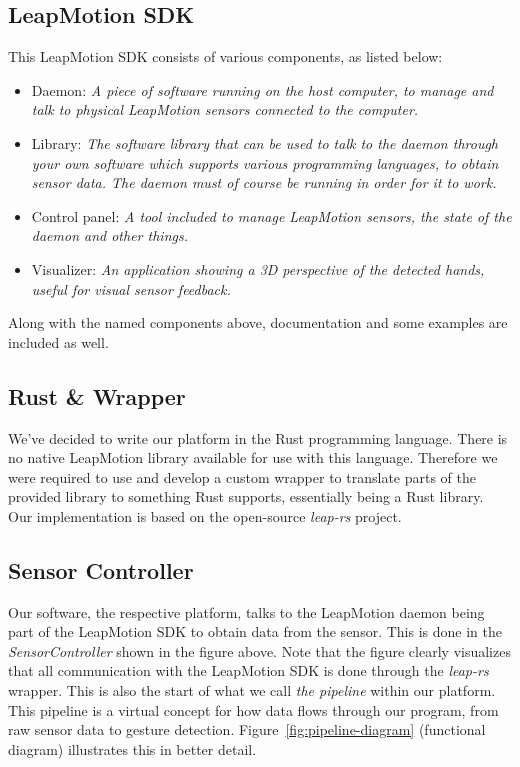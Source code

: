 \documentclass{standalone}
\begin{document}
  \subsection{LeapMotion SDK}
  This LeapMotion SDK consists of various components, as listed below:
  \begin{itemize}
    \tightlist{}
    \item Daemon: \textit{%
        A piece of software running on the host computer, to manage and talk
        to physical LeapMotion sensors connected to the computer.
      }
    \item Library: \textit{%
        The software library that can be used to talk to the daemon through
        your own software which supports various programming languages, to
        obtain sensor data. The daemon must of course be running in order for
        it to work.
      }
    \item Control panel: \textit{%
        A tool included to manage LeapMotion sensors, the state of the daemon
        and other things.
      }
    \item Visualizer: \textit{%
        An application showing a 3D perspective of the detected hands, useful
        for visual sensor feedback.
      }
  \end{itemize}
  Along with the named components above, documentation and some examples are
  included as well.

  \subsection{Rust \& Wrapper}
  We've decided to write our platform in the Rust programming language. There is
  no native LeapMotion library available for use with this language. Therefore
  we were required to use and develop a custom wrapper to translate parts of the
  provided library to something Rust supports, essentially being a Rust library.
  Our implementation is based on the open-source \emph{leap-rs} project.

  \subsection{Sensor Controller}
  Our software, the respective platform, talks to the LeapMotion daemon being
  part of the LeapMotion SDK to obtain data from the sensor. This is done in the
  \emph{SensorController} shown in the figure above. Note that the figure
  clearly visualizes that all communication with the LeapMotion SDK is done
  through the \emph{leap-rs} wrapper. This is also the start of what we call
  \emph{the pipeline} within our platform. This pipeline is a virtual concept
  for how data flows through our program, from raw sensor data to gesture
  detection.
  Figure~\ref{fig:pipeline-diagram} (functional diagram) illustrates this in better
  detail.
\end{document}

